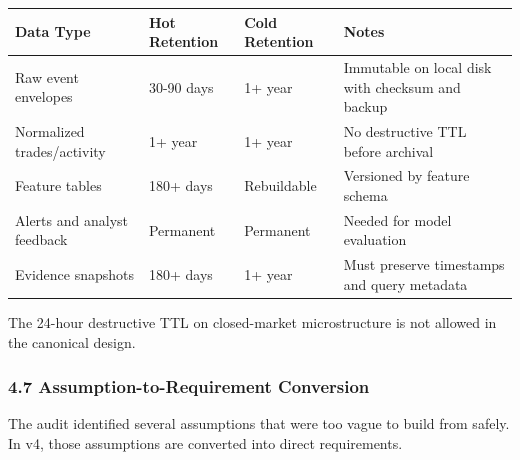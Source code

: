 \documentclass[
]{article}
\newcounter{none} %
\begin{document}
{\def\LTcaptype{none} %
\begin{longtable}[]{@{}llll@{}}
\toprule\noalign{}
Data Type & Hot Retention & Cold Retention & Notes \\
\midrule\noalign{}
\endhead
\bottomrule\noalign{}
\endlastfoot
Raw event envelopes & 30-90 days & 1+ year & Immutable on local disk
with checksum and backup \\
Normalized trades/activity & 1+ year & 1+ year & No destructive TTL
before archival \\
Feature tables & 180+ days & Rebuildable & Versioned by feature
schema \\
Alerts and analyst feedback & Permanent & Permanent & Needed for model
evaluation \\
Evidence snapshots & 180+ days & 1+ year & Must preserve timestamps and
query metadata \\
\end{longtable}
}

The 24-hour destructive TTL on closed-market microstructure is not
allowed in the canonical design.

\subsubsection{4.7 Assumption-to-Requirement
Conversion}\label{47-assumption-to-requirement-conversion}

The audit identified several assumptions that were too vague to build
from safely. In v4, those assumptions are converted into direct
requirements.
\end{document}
